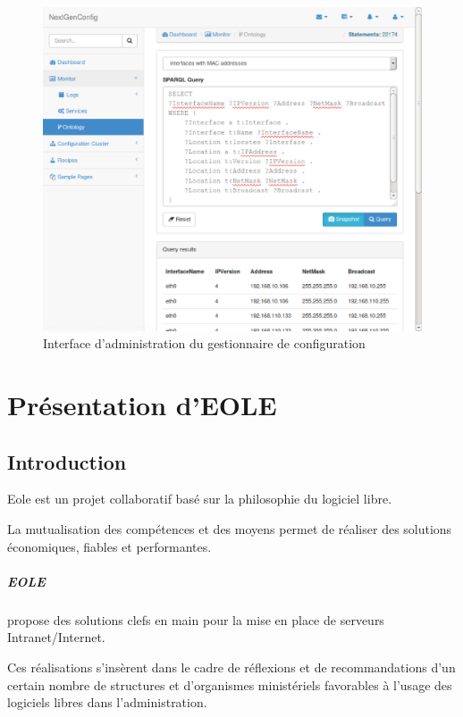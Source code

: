 \begin{figure}[H]
    \centerline{\includegraphics[width=\textwidth]{img/trifle_gui}}
    \caption{Interface d'administration du gestionnaire de configuration}
    \label{fig:trifle_gui}
\end{figure}



\chapter{Présentation d'EOLE}
\label{appendix:EOLE}

\section{Introduction}

Eole est un projet collaboratif basé sur la philosophie du logiciel libre.

La mutualisation des compétences et des moyens permet de réaliser des solutions
économiques, fiables et performantes.

\paragraph{EOLE} propose des solutions clefs en main pour la mise en place de
serveurs Intranet/Internet.

Ces réalisations s’insèrent dans le cadre de réflexions et de recommandations
d’un certain nombre de structures et d’organismes ministériels favorables à
l’usage des logiciels libres dans l’administration.


